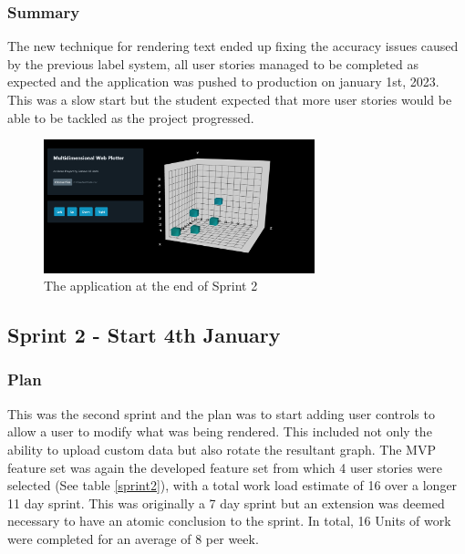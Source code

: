 \subsubsection{Summary}
The new technique for rendering text ended up fixing the accuracy issues caused by the previous label system, all user stories managed to be completed as expected and the application was pushed to production on january 1st, 2023. This was a slow start but the student expected that more user stories would be able to be tackled as the project progressed.

\begin{figure}[h]
    \centering
    \includegraphics[width=0.7\textwidth]{author-files/figures/Pretest1progress.png}
    \caption{The application at the end of Sprint 2}
    \label{fig:sprint2end}
\end{figure}

\subsection{Sprint 2 - Start 4th January} \label{spr2}
\subsubsection{Plan}
This was the second sprint and the plan was to start adding user controls to allow a user to modify what was being rendered. This included not only the ability to upload custom data but also rotate the resultant graph. The MVP feature set was again the developed feature set from which 4 user stories were selected (See table \ref{sprint2}), with a total work load estimate of 16 over a longer 11 day sprint. This was originally a 7 day sprint but an extension was deemed necessary to have an atomic conclusion to the sprint. In total, 16 Units of work were completed for an average of 8 per week.

